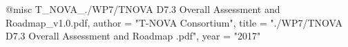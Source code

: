 @misc{ T_NOVA_./WP7/TNOVA D7.3 Overall Assessment and Roadmap_v1.0.pdf,
       author = "{T-NOVA Consortium}",
       title = "./WP7/TNOVA D7.3 Overall Assessment and Roadmap .pdf",
       year = "2017" }
